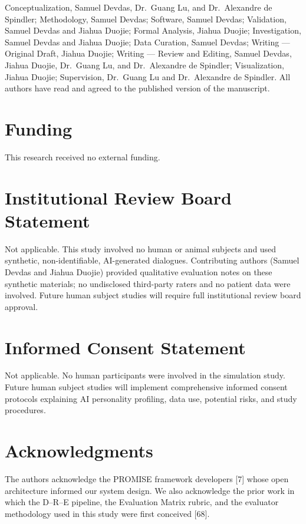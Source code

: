 \documentclass[apajournal,article,submit,moreauthors]{Definitions/mdpi}
\begin{document}
Conceptualization, Samuel Devdas, Dr.~Guang Lu, and Dr.~Alexandre de Spindler; Methodology, Samuel Devdas; Software, Samuel Devdas; Validation, Samuel Devdas and Jiahua Duojie; Formal Analysis, Jiahua Duojie; Investigation, Samuel Devdas and Jiahua Duojie; Data Curation, Samuel Devdas; Writing --- Original Draft, Jiahua Duojie; Writing --- Review and Editing, Samuel Devdas, Jiahua Duojie, Dr.~Guang Lu, and Dr.~Alexandre de Spindler; Visualization, Jiahua Duojie; Supervision, Dr.~Guang Lu and Dr.~Alexandre de Spindler. All authors have read and agreed to the published version of the manuscript.

\section{Funding}\label{funding}

This research received no external funding.

\section{Institutional Review Board Statement}\label{institutional-review-board-statement}

Not applicable. This study involved no human or animal subjects and used synthetic, non-identifiable, AI-generated dialogues. Contributing authors (Samuel Devdas and Jiahua Duojie) provided qualitative evaluation notes on these synthetic materials; no undisclosed third-party raters and no patient data were involved. Future human subject studies will require full institutional review board approval.

\section{Informed Consent Statement}\label{informed-consent-statement}

Not applicable. No human participants were involved in the simulation study. Future human subject studies will implement comprehensive informed consent protocols explaining AI personality profiling, data use, potential risks, and study procedures.

\section{Acknowledgments}\label{acknowledgments}

The authors acknowledge the PROMISE framework developers {[}7{]} whose open architecture informed our system design. We also acknowledge the prior work in which the D--R--E pipeline, the Evaluation Matrix rubric, and the evaluator methodology used in this study were first conceived {[}68{]}.
\end{document}
